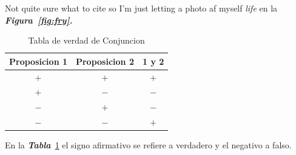 Not quite sure what to cite so I'm just letting a photo af myself \emph{life} en la \emph{\textbf{Figura~\ref{fig:fry}.}}

\begin{table}[h]
  \centering
  \begin{tabular}{| c  c  c  |}
    \hline
    Proposicion 1 & Proposicion 2 &1 y  2 \\\hline
    $+$ & $+$ & $+$\\\hline
    $+$ & $-$ & $-$\\\hline
    $-$ & $+$ & $-$\\\hline
    $-$ & $-$ & $+$\\\hline    
  \end{tabular}
  \caption{Tabla de verdad de Conjuncion}
  \label{tabla:afirmaciones}
\end{table}

En la \textbf{\emph{Tabla}}~\ref{tabla:afirmaciones} el signo afirmativo se refiere a verdadero y el negativo a falso.
